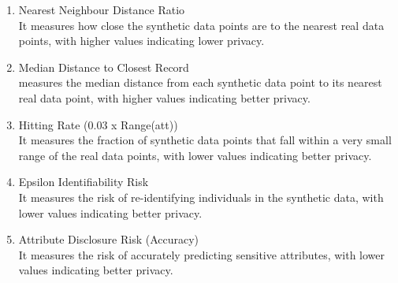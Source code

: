 \begin{enumerate}
    \item Nearest Neighbour Distance Ratio \\
     It measures how close the synthetic data points are to the nearest real data points, with higher values indicating lower privacy.

    \item Median Distance to Closest Record \\
    measures the median distance from each synthetic data point to its nearest real data point, with higher values indicating better privacy.

    \item Hitting Rate (0.03 x Range(att)) \\
    It measures the fraction of synthetic data points that fall within a very small range of the real data points, with lower values indicating better privacy.

    \item Epsilon Identifiability Risk \\
    It measures the risk of re-identifying individuals in the synthetic data, with lower values indicating better privacy.

    \item Attribute Disclosure Risk (Accuracy) \\
    It measures the risk of accurately predicting sensitive attributes, with lower values indicating better privacy.
    
\end{enumerate}